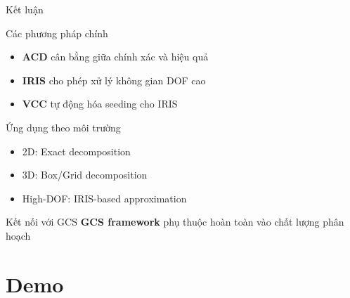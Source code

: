 \documentclass[aspectratio=169]{beamer}
\begin{document}
\begin{frame}{Kết luận}


    \begin{exampleblock}{Các phương pháp chính}
        \begin{itemize}
            \item \textbf{ACD} cân bằng giữa chính xác và hiệu quả
            \item \textbf{IRIS} cho phép xử lý không gian DOF cao
            \item \textbf{VCC} tự động hóa seeding cho IRIS
        \end{itemize}
    \end{exampleblock}

    \begin{alertblock}{Ứng dụng theo môi trường}
        \begin{itemize}
            \item 2D: Exact decomposition
            \item 3D: Box/Grid decomposition
            \item High-DOF: IRIS-based approximation
        \end{itemize}
    \end{alertblock}

    \begin{block}{Kết nối với GCS}
        \textbf{GCS framework} phụ thuộc hoàn toàn vào chất lượng phân hoạch
    \end{block}

\end{frame}

\section{Demo}


        
\end{document}
